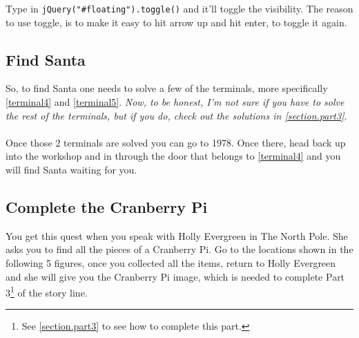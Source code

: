 \documentclass[writeup.tex]{subfiles}
\begin{document}
	Type in \lstinline!jQuery("#floating").toggle()! and it'll toggle the visibility. The reason to use toggle, is to make it easy to hit arrow up and hit enter, to toggle it again.

	\subsection{Find Santa} \label{subsection.quest_find_santa}
		So, to find Santa one needs to solve a few of the terminals, more specifically \autoref{terminal4} and \autoref{terminal5}. \textit{Now, to be honest, I'm not sure if you have to solve the rest of the terminals, but if you do, check out the solutions in \autoref{section.part3}}.\\
		\\
		Once those 2 terminals are solved you can go to 1978. Once there, head back up into the workshop and in through the door that belongs to \autoref{terminal4} and you will find Santa waiting for you.
	
	\subsection{Complete the Cranberry Pi} \label{subsection.quest_cranberry_pi}
		You get this quest when you speak with Holly Evergreen in The North Pole. She asks you to find all the pieces of a Cranberry Pi. Go to the locations shown in the following 5 figures, once you collected all the items, return to Holly Evergreen and she will give you the Cranberry Pi image, which is needed to complete Part 3\footnote{See \autoref{section.part3} to see how to complete this part.} of the story line.
		
\end{document}
